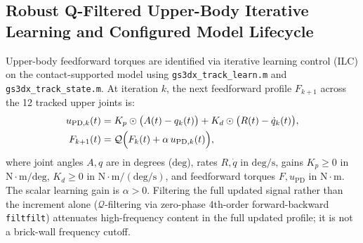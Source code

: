 \documentclass[11pt,a4paper]{article}
\begin{document}
\subsection{Robust Q-Filtered Upper-Body Iterative Learning and Configured Model Lifecycle}
\label{subsec:upper_body_iterative_learning}

Upper-body feedforward torques are identified via iterative learning control (ILC)
on the contact-supported model using \texttt{gs3dx\_track\_learn.m} and \texttt{gs3dx\_track\_state.m}.
At iteration $k$, the next feedforward profile $F_{k+1}$ across the 12 tracked upper joints is:
\begin{align}
  u_{\mathrm{PD},k}(t) &= K_p \odot \bigl(A(t) - q_k(t)\bigr) + K_d \odot \bigl(R(t) - \dot{q}_k(t)\bigr), \label{eq:ilc_pd_torque} \\
  F_{k+1}(t) &= \mathcal{Q}\Bigl(F_k(t) + \alpha \, u_{\mathrm{PD},k}(t)\Bigr), \label{eq:ilc_q_update}
\end{align}
where joint angles $A, q$ are in degrees ($\mathrm{deg}$), rates $R, \dot{q}$ in $\mathrm{deg/s}$, gains $K_p \ge 0$ in $\mathrm{N\cdot m/deg}$, $K_d \ge 0$ in $\mathrm{N\cdot m/(deg/s)}$, and feedforward torques $F, u_{\mathrm{PD}}$ in $\mathrm{N\cdot m}$. The scalar learning gain is $\alpha > 0$. Filtering the full updated signal rather than the increment alone ($\mathcal{Q}$-filtering via zero-phase 4th-order forward-backward \texttt{filtfilt}) attenuates high-frequency content in the full updated profile; it is not a brick-wall frequency cutoff.
\end{document}
